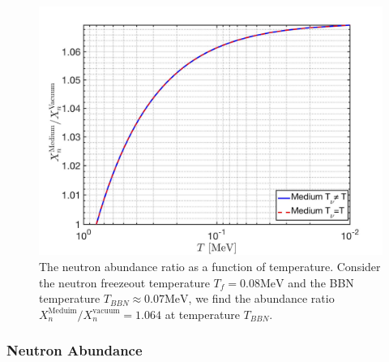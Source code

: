 \begin{figure}[ht]
\begin{center}
\includegraphics[width=\linewidth]{./plots/Neutron_Abundance}
\caption{The neutron abundance ratio as a function of temperature. Consider the neutron freezeout temperature $T_f=0.08\mathrm{MeV}$ and the BBN temperature $T_{BBN}\approx0.07\mathrm{MeV}$, we find the abundance ratio ${X_n^{\mathrm{Meduim}}}/{X_n^{\mathrm{vacuum}}}=1.064$ at temperature $T_{BBN}$.}%
\label{Neutron_Abundance}
\end{center}
\end{figure}
\subsubsection{Neutron Abundance}\label{Neutron}

